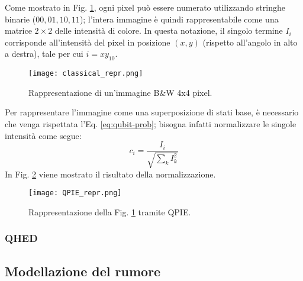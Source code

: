 Come mostrato in Fig.
\ref{fig:bw-4x4-img},
ogni pixel può essere numerato utilizzando stringhe binarie ($00,01,10,11$);
l'intera immagine è quindi
rappresentabile come una matrice $2\times2$ delle intensità di colore. In questa
notazione, il singolo termine $I_{i}$ corrisponde all'intensità del pixel in posizione
$(x,y)$ (rispetto all'angolo in alto a destra), tale per cui $i = {xy}_{10}$.
\begin{figure}[h!]
    \centering
    \texttt{[image: classical\_repr.png]}
		\caption{Rappresentazione di un'immagine B\&W 4x4 pixel.}
    \label{fig:bw-4x4-img}
\end{figure}

Per rappresentare l'immagine come una superposizione di stati base, è necessario
che venga rispettata l'Eq. \ref{eq:qubit-prob}; bisogna infatti normalizzare le singole intensità come segue:
\begin{equation}
	c_i = \frac{I_i}{\sqrt{\sum_{k}^{}{I_{k}^2}}}
	\label{eq:intensities-norm}
\end{equation}
In Fig. \ref{fig:bw-4x4-img-qpie}
viene mostrato il risultato della normalizzazione.

\begin{figure}[h!]
    \centering
    \texttt{[image: QPIE\_repr.png]}
		\caption{Rappresentazione della Fig. \ref{fig:bw-4x4-img} tramite QPIE.}
    \label{fig:bw-4x4-img-qpie}
\end{figure}



\subsubsection*{QHED}

\subsection{Modellazione del rumore}
